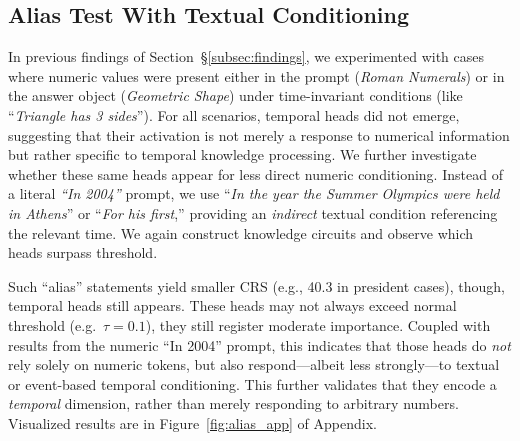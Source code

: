 \subsection{Alias Test With Textual Conditioning}
\label{subsec:alias-test}
In previous findings of Section~\S\ref{subsec:findings}, we experimented with cases where numeric values were present either in the prompt (\textit{Roman Numerals}) or in the answer object (\textit{Geometric Shape}) under time-invariant conditions (like “\emph{Triangle has 3 sides}”).
For all scenarios, temporal heads did not emerge, suggesting that their activation is not merely a response to numerical information but rather specific to temporal knowledge processing.
We further investigate whether these same heads appear for less direct numeric conditioning.
Instead of a literal \textit{“In 2004”} prompt, we use “\textit{In the year the Summer Olympics were held in Athens}” or “\textit{For his first},” providing an \emph{indirect} textual condition referencing the relevant time. 
We again construct knowledge circuits and observe which heads surpass threshold.

Such “alias” statements yield smaller CRS (e.g., 40.3 in president cases), though, temporal heads still appears.
These heads may not always exceed normal threshold (e.g.\ \(\tau = 0.1\)), they still register moderate importance. 
Coupled with results from the numeric “In 2004” prompt, this indicates that those heads do \emph{not} rely solely on numeric tokens, but also respond—albeit less strongly—to textual or event-based temporal conditioning.
This further validates that they encode a \emph{temporal} dimension, rather than merely responding to arbitrary numbers.
Visualized results are in Figure~\ref{fig:alias_app} of Appendix.